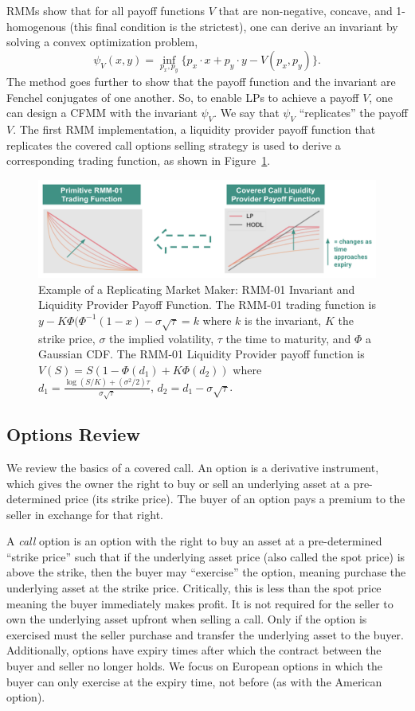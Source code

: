 \documentclass[hidelinks, 12pt]{article}
\begin{document}
RMMs \cite{angeris2021replicating} show that for all payoff functions $V$ that are non-negative, concave, and 1-homogenous (this final condition is the strictest), one can derive an invariant by solving a convex optimization problem,
\[ \psi_V(x, y) = \inf_{p_x, p_y} \{ p_x \cdot x + p_y \cdot y - V(p_x, p_y) \}. \]
The method goes further to show that the payoff function and the invariant are Fenchel conjugates of one another. So, to enable LPs to achieve a payoff $V$, one can design a CFMM with the invariant $\psi_V$. We say that $\psi_V$ ``replicates'' the payoff $V$. The first RMM implementation, a liquidity provider payoff function that replicates the covered call options selling strategy is used to derive a corresponding trading function, as shown in Figure~\ref{fig:rmmpayoff}.

\begin{figure}[h!]
    \centering
    \includegraphics[width=0.8\linewidth]{rmmpayoff.png}
    \caption{Example of a Replicating Market Maker: RMM-01 Invariant and Liquidity Provider Payoff Function. The RMM-01 trading function is $y - K\Phi(\Phi^{-1}(1-x) - \sigma\sqrt{\tau} = k$ where $k$ is  the invariant, $K$ the strike price, $\sigma$ the implied volatility, $\tau$ the time to maturity, and $\Phi$ a Gaussian CDF.
    The RMM-01 Liquidity Provider payoff function is $V(S) = S(1-\Phi(d_1)+K\Phi(d_2))$ where $d_1 = \frac{\log(S/K) + (\sigma^2/2)\tau}{\sigma\sqrt{\tau}}$, $d_2 = d_1 - \sigma\sqrt{\tau}$.}
    \label{fig:rmmpayoff}
\end{figure}

\subsection{Options Review}
\label{sec:options}

We review the basics of a covered call. An option is a derivative instrument, which gives the owner the right to buy or sell an underlying asset at a pre-determined price (its strike price). The buyer of an option pays a premium to the seller in exchange for that right.

A \textit{call} option is an option with the right to buy an asset at a pre-determined ``strike price'' such that if the underlying asset price (also called the spot price) is above the strike, then the buyer may ``exercise'' the option, meaning purchase the underlying asset at the strike price. Critically, this is less than the spot price meaning the buyer immediately makes profit. It is not required for the seller to own the underlying asset upfront when selling a call. Only if the option is exercised must the seller purchase and transfer the underlying asset to the buyer. Additionally, options have expiry times after which the contract between the buyer and seller no longer holds. We focus on European options in which the buyer can only exercise at the expiry time, not before (as with the American option).
\end{document}
